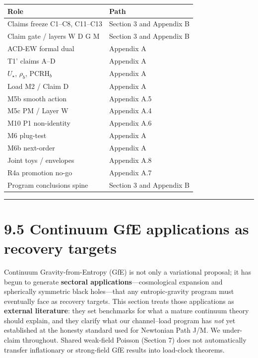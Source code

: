 \documentclass[
  11pt,
]{article}
\newcounter{none} %
\begin{document}
{\def\LTcaptype{none} %
\begin{longtable}[]{@{}ll@{}}
\toprule\noalign{}
Role & Path \\
\midrule\noalign{}
\endhead
\bottomrule\noalign{}
\endlastfoot
Claims freeze C1--C8, C11--C13 & Section 3 and Appendix B \\
Claim gate / layers W D G M & Section 3 and Appendix B \\
ACD-EW formal dual & Appendix A \\
T1' claims A--D & Appendix A \\
\(U_\star\), \(\rho_b\), PCRH\(_b\) & Appendix A \\
Load M2 / Claim D & Appendix A \\
M5b smooth action & Appendix A.5 \\
M5c PM / Layer W & Appendix A.4 \\
M10 P1 non-identity & Appendix A.6 \\
M6 plug-test & Appendix A \\
M6b next-order & Appendix A \\
Joint toys / envelopes & Appendix A.8 \\
R4a promotion no-go & Appendix A.7 \\
Program conclusions spine & Section 3 and Appendix B \\
\end{longtable}
}

\begin{center}\rule{0.5\linewidth}{0.5pt}\end{center}

\section{9.5 Continuum GfE applications as recovery
targets}\label{continuum-gfe-applications-as-recovery-targets}

Continuum Gravity-from-Entropy (GfE) is not only a variational proposal;
it has begun to generate \textbf{sectoral applications}---cosmological
expansion and spherically symmetric black holes---that any
entropic-gravity program must eventually face as recovery targets. This
section treats those applications as \textbf{external literature}: they
set benchmarks for what a mature continuum theory should explain, and
they clarify what our channel--load program has \emph{not} yet
established at the honesty standard used for Newtonian Path J/M. We
under-claim throughout. Shared weak-field Poisson (Section 7) does not
automatically transfer inflationary or strong-field GfE results into
load-clock theorems.
\end{document}
